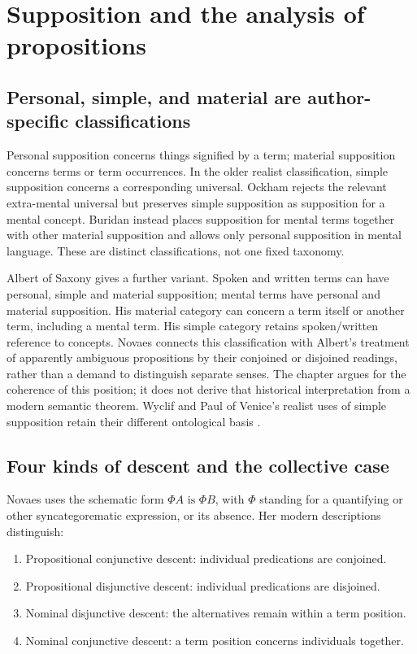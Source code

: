 \section{Supposition and the analysis of propositions}
\label{sec:p13-latin-supposition}

\subsection{Personal, simple, and material are author-specific classifications}

Personal supposition concerns things signified by a term; material
supposition concerns terms or term occurrences. In the older realist
classification, simple supposition concerns a corresponding universal.
Ockham rejects the relevant extra-mental universal but preserves simple
supposition as supposition for a mental concept. Buridan instead places
supposition for mental terms together with other material supposition
and allows only personal supposition in mental language.
These are distinct classifications, not one fixed taxonomy.

Albert of Saxony gives a further variant. Spoken and written terms can
have personal, simple and material supposition; mental terms have personal
and material supposition. His material category can concern a term itself
or another term, including a mental term. His simple category retains
spoken/written reference to concepts. Novaes connects this classification
with Albert's treatment of apparently ambiguous propositions by their
conjoined or disjoined readings, rather than a demand to distinguish
separate senses. The chapter argues for the coherence of this position;
it does not derive that historical interpretation from a modern semantic
theorem. Wyclif and Paul of Venice's realist uses of simple supposition
retain their different ontological basis
\cite[pp.~449--452]{DutilhNovaes2007FordhamChapter8}.

\subsection{Four kinds of descent and the collective case}

Novaes uses the schematic form \(\Phi A\text{ is }\Phi B\), with \(\Phi\)
standing for a quantifying or other syncategorematic expression, or its
absence. Her modern descriptions distinguish:

\begin{enumerate}
\item Propositional conjunctive descent: individual predications are conjoined.
\item Propositional disjunctive descent: individual predications are disjoined.
\item Nominal disjunctive descent: the alternatives remain within a term position.
\item Nominal conjunctive descent: a term position concerns individuals together.
\end{enumerate}

